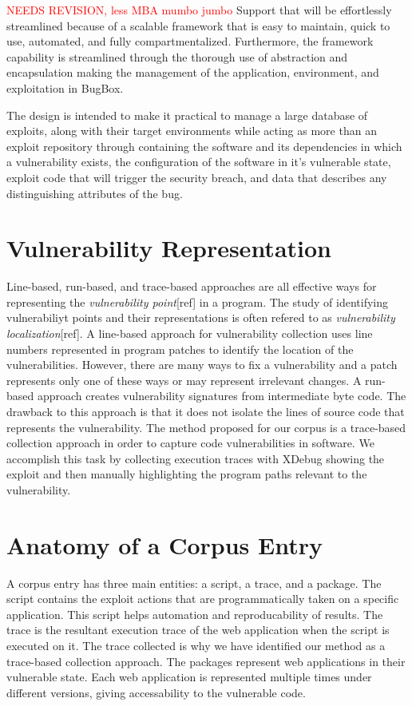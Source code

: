\documentclass[letterpaper,twocolumn,10pt]{article}
\begin{document}
\textcolor{red}{ NEEDS REVISION, less MBA mumbo jumbo }
Support that will be effortlessly streamlined because of a scalable framework that is easy to maintain, quick to use, automated, and fully compartmentalized.  Furthermore, the framework capability is streamlined through the thorough use of abstraction and encapsulation making the management of the application, environment, and exploitation in BugBox. 

 The design is intended to make it practical to manage a large database of exploits, along with their target environments while acting as more than an exploit repository through containing the software and its dependencies in which a vulnerability exists, the configuration of the software in it's vulnerable state, exploit code that will trigger the security breach, and data that describes any distinguishing attributes of the bug.


\section{Vulnerability Representation}


Line-based, run-based, and trace-based approaches are all effective ways for representing the \emph{vulnerability point}[ref] in a program.  The study of identifying vulnerabiliyt points and their representations is often refered to as \emph{vulnerability localization}[ref].  A line-based\cite{4630094} approach for vulnerability collection uses line numbers represented in program patches to identify the location of the vulnerabilities.  However, there are many ways to fix a vulnerability and a patch represents only one of these ways or may represent irrelevant changes.  A run-based\cite{Song:2008:BNA:1496255.1496257} approach creates vulnerability signatures from intermediate byte code.  The drawback to this approach is that it does not isolate the lines of source code that represents the vulnerability.  The method proposed for our corpus is a trace-based collection approach in order to capture code vulnerabilities in software.  We accomplish this task by collecting execution traces with XDebug showing the exploit and then manually highlighting the program paths relevant to the vulnerability.


\section{Anatomy of a Corpus Entry}

A corpus entry has three main entities: a script, a trace, and a package.  The script contains the exploit actions that are programmatically taken on a specific application.  This script helps automation and reproducability of results.  The trace is the resultant execution trace of the web application when the script is executed on it.  The trace collected is why we have identified our method as a trace-based collection approach.  The packages represent web applications in their vulnerable state.  Each web application is represented multiple times under different versions, giving accessability to the vulnerable code. 
\end{document}
